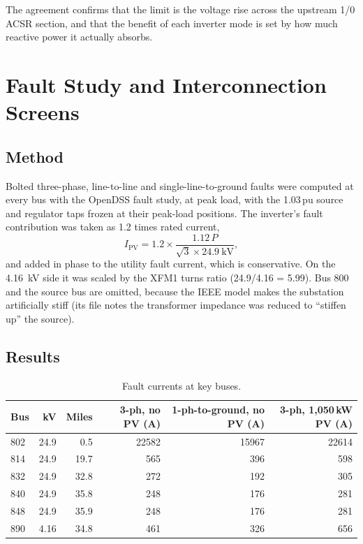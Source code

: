 \documentclass[11pt,letterpaper]{article}
\begin{document}
The agreement confirms that the limit is the voltage rise across the upstream 1/0 ACSR section, and that the
benefit of each inverter mode is set by how much reactive power it actually absorbs.

\section{Fault Study and Interconnection Screens}

\subsection{Method}
Bolted three-phase, line-to-line and single-line-to-ground faults were computed at every bus with the OpenDSS
fault study, at peak load, with the 1.03\,pu source and regulator taps frozen at their peak-load positions.
The inverter's fault contribution was taken as 1.2 times rated current,
\[
  I_\text{PV} = 1.2\times\frac{1.12\,P}{\sqrt{3}\times24.9\ \text{kV}},
\]
and added in phase to the utility fault current, which is conservative. On the \SI{4.16}{kV} side it was scaled
by the XFM1 turns ratio (24.9/4.16 = 5.99). Bus 800 and the source bus are omitted, because the IEEE model makes
the substation artificially stiff (its file notes the transformer impedance was reduced to ``stiffen up'' the
source).

\subsection{Results}
\begin{table}[H]
\centering
\small
\begin{tabular}{@{}lrrrrr@{}}
\toprule
Bus & kV & Miles & 3-ph, no PV (A) & 1-ph-to-ground, no PV (A) & 3-ph, 1{,}050\,kW PV (A) \\
\midrule
802 & 24.9 & 0.5 & \num{22582} & \num{15967} & \num{22614} \\
814 & 24.9 & 19.7 & 565 & 396 & 598 \\
832 & 24.9 & 32.8 & 272 & 192 & 305 \\
840 & 24.9 & 35.8 & 248 & 176 & 281 \\
848 & 24.9 & 35.9 & 248 & 176 & 281 \\
890 & 4.16 & 34.8 & 461 & 326 & 656 \\
\bottomrule
\end{tabular}
\caption{Fault currents at key buses.}
\label{tab:fault}
\end{table}
\end{document}
